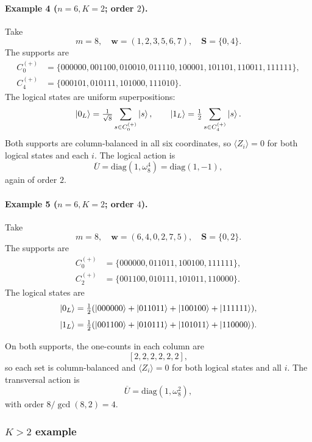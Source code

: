 \documentclass[pdflatex,sn-nature]{sn-jnl}%
\theoremstyle{thmstyleone}%
\theoremstyle{thmstyletwo}%
\theoremstyle{thmstylethree}%
\begin{document}
\begin{appendices}
\paragraph{Example 4 ($n=6,K=2$; order $2$).}
Take
\[
  m=8,\quad \mathbf w=(1,2,3,5,6,7),\quad \mathbf S=\{0,4\}.
\]
The supports are
\[
  \begin{aligned}
      C^{(+)}_{0} & =\{000000,001100,010010,011110,100001,101101,110011,111111\}, \\
      C^{(+)}_{4} & =\{000101,010111,101000,111010\}.
  \end{aligned}
\]
The logical states are uniform superpositions:
\[
  \ket{0_L}=\tfrac{1}{\sqrt8} \sum_{s\in C^{(+)}_{0}}\ket{s},\qquad
  \ket{1_L}=\tfrac{1}{2} \sum_{s\in C^{(+)}_{4}}\ket{s}.
\]
Both supports are column-balanced in all six coordinates, so $\langle Z_i\rangle=0$ for both logical states and each $i$. The logical action is
\[
  \overline U=\mathrm{diag}(1,\omega_8^{4})=\mathrm{diag}(1,-1),
\]
again of order $2$.

\paragraph{Example 5 ($n=6,K=2$; order $4$).}
Take
\[
  m=8,\quad \mathbf w=(6,4,0,2,7,5),\quad \mathbf S=\{0,2\}.
\]
The supports are
\[
  \begin{aligned}
      C^{(+)}_{0} & =\{000000,011011,100100,111111\}, \\
      C^{(+)}_{2} & =\{001100,010111,101011,110000\}.
  \end{aligned}
\]
The logical states are
\[
  \ket{0_L}=\tfrac{1}{2}(\ket{000000}+\ket{011011}+\ket{100100}+\ket{111111}),
\]
\[
  \ket{1_L}=\tfrac{1}{2}(\ket{001100}+\ket{010111}+\ket{101011}+\ket{110000}).
\]

On both supports, the one-counts in each column are
\[
  [2,2,2,2,2,2],
\]
so each set is column-balanced and $\langle Z_i\rangle=0$ for both logical states and all $i$. The transversal action is
\[
  \overline U=\mathrm{diag}(1,\omega_8^{2}),
\]
with order $8/\gcd(8,2)=4$.

\subsubsection{$K>2$ example}


\end{appendices}
\end{document}

